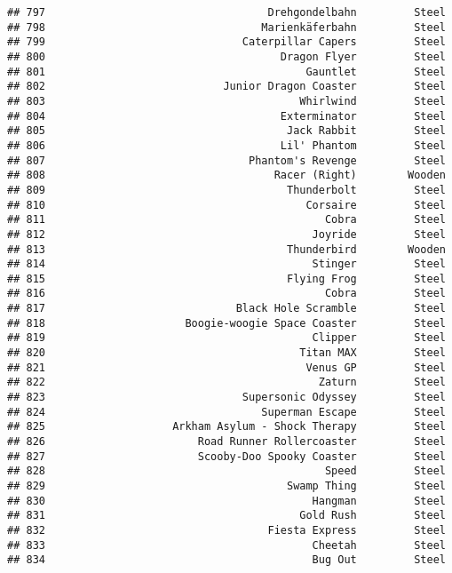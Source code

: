 \documentclass[
]{article}
\begin{document}
\begin{verbatim}
## 797                                   Drehgondelbahn         Steel
## 798                                  Marienkäferbahn         Steel
## 799                               Caterpillar Capers         Steel
## 800                                     Dragon Flyer         Steel
## 801                                         Gauntlet         Steel
## 802                            Junior Dragon Coaster         Steel
## 803                                        Whirlwind         Steel
## 804                                     Exterminator         Steel
## 805                                      Jack Rabbit         Steel
## 806                                     Lil' Phantom         Steel
## 807                                Phantom's Revenge         Steel
## 808                                    Racer (Right)        Wooden
## 809                                      Thunderbolt         Steel
## 810                                         Corsaire         Steel
## 811                                            Cobra         Steel
## 812                                          Joyride         Steel
## 813                                      Thunderbird        Wooden
## 814                                          Stinger         Steel
## 815                                      Flying Frog         Steel
## 816                                            Cobra         Steel
## 817                              Black Hole Scramble         Steel
## 818                      Boogie-woogie Space Coaster         Steel
## 819                                          Clipper         Steel
## 820                                        Titan MAX         Steel
## 821                                         Venus GP         Steel
## 822                                           Zaturn         Steel
## 823                               Supersonic Odyssey         Steel
## 824                                  Superman Escape         Steel
## 825                    Arkham Asylum - Shock Therapy         Steel
## 826                        Road Runner Rollercoaster         Steel
## 827                        Scooby-Doo Spooky Coaster         Steel
## 828                                            Speed         Steel
## 829                                      Swamp Thing         Steel
## 830                                          Hangman         Steel
## 831                                        Gold Rush         Steel
## 832                                   Fiesta Express         Steel
## 833                                          Cheetah         Steel
## 834                                          Bug Out         Steel

\end{verbatim}
\end{document}
